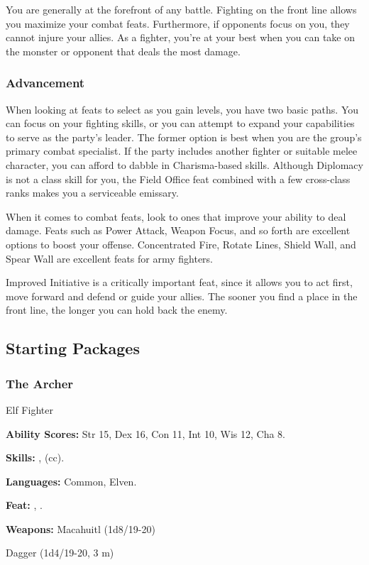 You are generally at the forefront of any battle. Fighting on the front line allows you maximize your combat feats. Furthermore, if opponents focus on you, they cannot injure your allies. As a fighter, you're at your best when you can take on the monster or opponent that deals the most damage.

\subsubsection{Advancement}
When looking at feats to select as you gain levels, you have two basic paths. You can focus on your fighting skills, or you can attempt to expand your capabilities to serve as the party's leader. The former option is best when you are the group's primary combat specialist. If the party includes another fighter or suitable melee character, you can afford to dabble in Charisma-based skills. Although Diplomacy is not a class skill for you, the Field Office feat combined with a few cross-class ranks makes you a serviceable emissary.

When it comes to combat feats, look to ones that improve your ability to deal damage. Feats such as Power Attack, Weapon Focus, and so forth are excellent options to boost your offense. Concentrated Fire, Rotate Lines, Shield Wall, and Spear Wall are excellent feats for army fighters.

Improved Initiative is a critically important feat, since it allows you to act first, move forward and defend or guide your allies. The sooner you find a place in the front line, the longer you can hold back the enemy.


\subsection{Starting Packages}
\subsubsection{The Archer}
Elf Fighter

\textbf{Ability Scores:} Str 15, Dex 16, Con 11, Int 10, Wis 12, Cha 8.

\textbf{Skills:} ,  (cc).

\textbf{Languages:} Common, Elven.

\textbf{Feat:} , .

\textbf{Weapons:} Macahuitl (1d8/19-20)

Dagger (1d4/19-20, 3 m)

